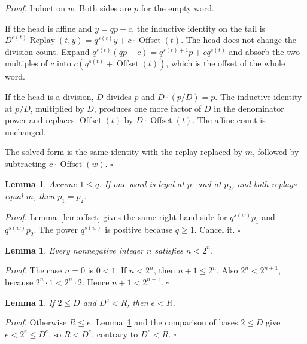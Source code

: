 \documentclass[11pt,letterpaper]{article}
\newtheorem{lemma}[theorem]{Lemma}
\newenvironment{proof}{\noindent\textit{Proof.}}{\hfill\(\square\)}
\begin{document}
\begin{proof}
Induct on \(w\). Both sides are \(p\) for the empty word.

If the head is affine and \(y=qp+c\), the inductive identity on the tail is \(D^{e(t)}\operatorname{Replay}(t,y)=q^{s(t)}y+c\cdot\operatorname{Offset}(t)\). The head does not change the division count. Expand \(q^{s(t)}(qp+c)=q^{s(t)+1}p+cq^{s(t)}\) and absorb the two multiples of \(c\) into \(c(q^{s(t)}+\operatorname{Offset}(t))\), which is the offset of the whole word.

If the head is a division, \(D\) divides \(p\) and \(D\cdot(p/D)=p\). The inductive identity at \(p/D\), multiplied by \(D\), produces one more factor of \(D\) in the denominator power and replaces \(\operatorname{Offset}(t)\) by \(D\cdot\operatorname{Offset}(t)\). The affine count is unchanged.

The solved form is the same identity with the replay replaced by \(m\), followed by subtracting \(c\cdot\operatorname{Offset}(w)\).
\end{proof}

\begin{lemma}
\label{lem:unique}
Assume \(1\le q\). If one word is legal at \(p_1\) and at \(p_2\), and both replays equal \(m\), then \(p_1=p_2\).
\end{lemma}

\begin{proof}
Lemma~\ref{lem:offset} gives the same right-hand side for \(q^{s(w)}p_1\) and \(q^{s(w)}p_2\). The power \(q^{s(w)}\) is positive because \(q\ge 1\). Cancel it.
\end{proof}

\begin{lemma}
\label{lem:two-pow}
Every nonnegative integer \(n\) satisfies \(n<2^n\).
\end{lemma}

\begin{proof}
The case \(n=0\) is \(0<1\). If \(n<2^n\), then \(n+1\le 2^n\). Also \(2^n<2^{n+1}\), because \(2^n\cdot 1<2^n\cdot 2\). Hence \(n+1<2^{n+1}\).
\end{proof}

\begin{lemma}
\label{lem:exponent}
If \(2\le D\) and \(D^e<R\), then \(e<R\).
\end{lemma}

\begin{proof}
Otherwise \(R\le e\). Lemma~\ref{lem:two-pow} and the comparison of bases \(2\le D\) give \(e<2^e\le D^e\), so \(R<D^e\), contrary to \(D^e<R\).
\end{proof}
\end{document}
